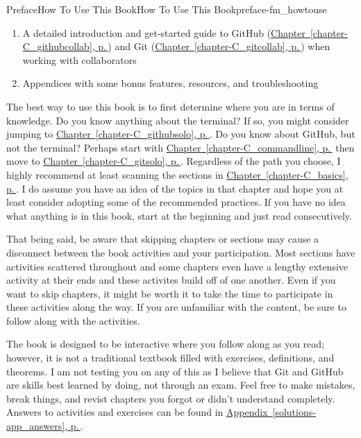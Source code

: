 \documentclass[twoside,10pt,]{book}
\newcommand{\xreffont}{\relax}
\begin{document}
\begin{preface}{Preface}{How To Use This Book}{}{How To Use This Book}{}{}{preface-fm_howtouse}
\begin{enumerate}
\item{}A detailed introduction and get-started guide to GitHub (\hyperref[chapter-C_githubcollab]{Chapter~{\xreffont\ref{chapter-C_githubcollab}}, p.\,\pageref{chapter-C_githubcollab}}) and Git (\hyperref[chapter-C_gitcollab]{Chapter~{\xreffont\ref{chapter-C_gitcollab}}, p.\,\pageref{chapter-C_gitcollab}}) when working with collaborators%
\item{}Appendices with some bonus features, resources, and troubleshooting%
\end{enumerate}
%
\par
The best way to use this book is to first determine where you are in terms of knowledge. Do you know anything about the terminal? If so, you might consider jumping to \hyperref[chapter-C_githubsolo]{Chapter~{\xreffont\ref{chapter-C_githubsolo}}, p.\,\pageref{chapter-C_githubsolo}}. Do you know about GitHub, but not the terminal? Perhaps start with \hyperref[chapter-C_commandline]{Chapter~{\xreffont\ref{chapter-C_commandline}}, p.\,\pageref{chapter-C_commandline}} then move to \hyperref[chapter-C_gitsolo]{Chapter~{\xreffont\ref{chapter-C_gitsolo}}, p.\,\pageref{chapter-C_gitsolo}}. Regardless of the path you choose, I highly recommend at least scanning the sections in \hyperref[chapter-C_basics]{Chapter~{\xreffont\ref{chapter-C_basics}}, p.\,\pageref{chapter-C_basics}}. I do assume you have an idea of the topics in that chapter and hope you at least consider adopting some of the recommended practices. If you have no idea what anything is in this book, start at the beginning and just read consecutively.%
\par
That being said, be aware that skipping chapters or sections may cause a disconnect between the book activities and your participation. Most sections have activities scattered throughout and some chapters even have a lengthy extensive activity at their ends and these activites build off of one another. Even if you want to skip chapters, it might be worth it to take the time to participate in these activities along the way. If you are unfamiliar with the content, be sure to follow along with the activities.%
\par
The book is designed to be interactive where you follow along as you read; however, it is not a traditional textbook filled with exercises, definitions, and theorems. I am not testing you on any of this as I believe that Git and GitHub are skills best learned by doing, not through an exam. Feel free to make mistakes, break things, and revist chapters you forgot or didn't understand completely. Answers to activities and exercises can be found in \hyperref[solutions-app_answers]{Appendix~{\xreffont\ref{solutions-app_answers}}, p.\,\pageref{solutions-app_answers}}.%

\end{preface}
\end{document}
